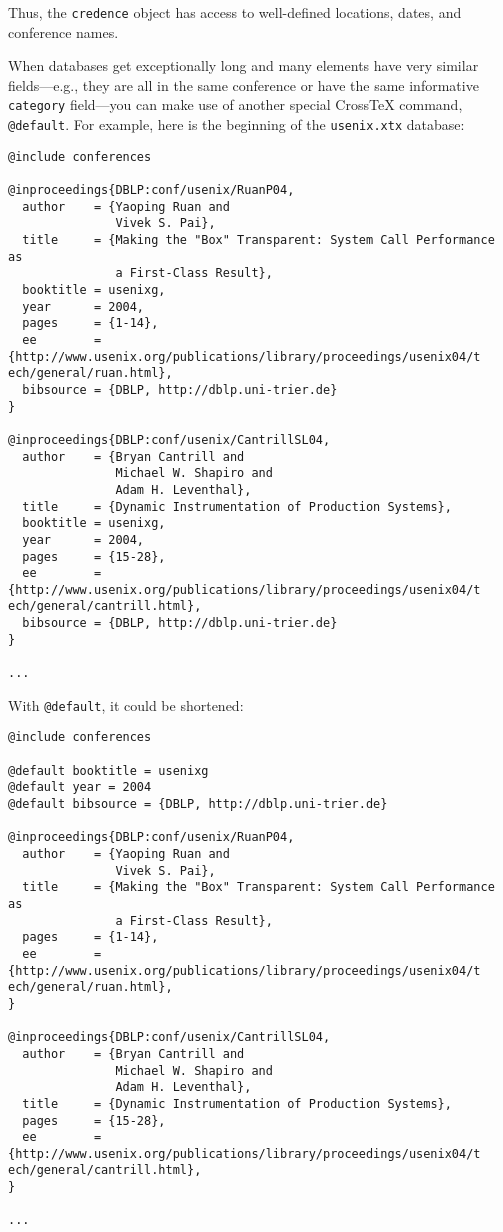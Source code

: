 \documentclass{article}
\newcommand{\XTeX}{Cross\TeX}
\begin{document}
Thus, the \texttt{credence} object has access to well-defined locations, dates, and conference names.

When databases get exceptionally long and many elements have very similar fields---e.g., they are all in the same conference or have the same informative \texttt{category} field---you can make use of another special \XTeX{} command, \texttt{@default}. For example, here is the beginning of the \texttt{usenix.xtx} database:

\begin{small}\begin{verbatim}
@include conferences

@inproceedings{DBLP:conf/usenix/RuanP04,
  author    = {Yaoping Ruan and
               Vivek S. Pai},
  title     = {Making the "Box" Transparent: System Call Performance as
               a First-Class Result},
  booktitle = usenixg,
  year      = 2004,
  pages     = {1-14},
  ee        = {http://www.usenix.org/publications/library/proceedings/usenix04/t
ech/general/ruan.html},
  bibsource = {DBLP, http://dblp.uni-trier.de}
}

@inproceedings{DBLP:conf/usenix/CantrillSL04,
  author    = {Bryan Cantrill and
               Michael W. Shapiro and
               Adam H. Leventhal},
  title     = {Dynamic Instrumentation of Production Systems},
  booktitle = usenixg,
  year      = 2004,
  pages     = {15-28},
  ee        = {http://www.usenix.org/publications/library/proceedings/usenix04/t
ech/general/cantrill.html},
  bibsource = {DBLP, http://dblp.uni-trier.de}
}

...
\end{verbatim}\end{small}

With \texttt{@default}, it could be shortened:

\begin{small}\begin{verbatim}
@include conferences

@default booktitle = usenixg
@default year = 2004
@default bibsource = {DBLP, http://dblp.uni-trier.de}

@inproceedings{DBLP:conf/usenix/RuanP04,
  author    = {Yaoping Ruan and
               Vivek S. Pai},
  title     = {Making the "Box" Transparent: System Call Performance as
               a First-Class Result},
  pages     = {1-14},
  ee        = {http://www.usenix.org/publications/library/proceedings/usenix04/t
ech/general/ruan.html},
}

@inproceedings{DBLP:conf/usenix/CantrillSL04,
  author    = {Bryan Cantrill and
               Michael W. Shapiro and
               Adam H. Leventhal},
  title     = {Dynamic Instrumentation of Production Systems},
  pages     = {15-28},
  ee        = {http://www.usenix.org/publications/library/proceedings/usenix04/t
ech/general/cantrill.html},
}

...
\end{verbatim}\end{small}
\end{document}
